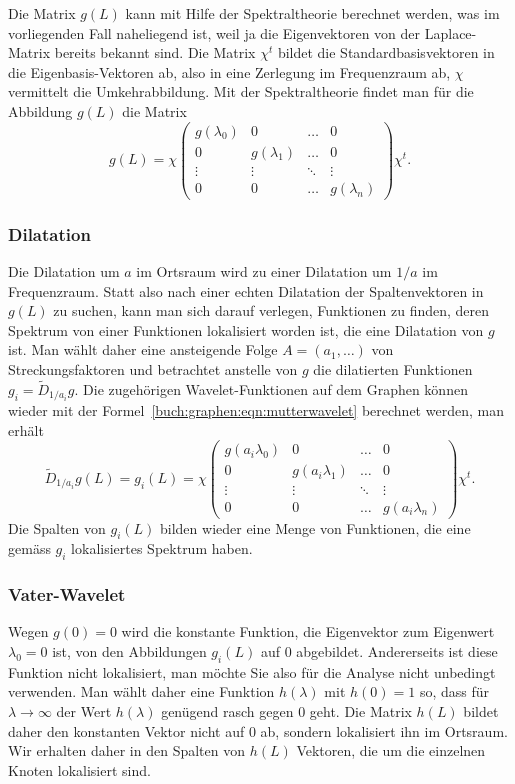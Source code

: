 Die Matrix $g(L)$ kann mit Hilfe der Spektraltheorie berechnet werden,
was im vorliegenden Fall naheliegend ist, weil ja die Eigenvektoren von
der Laplace-Matrix bereits bekannt sind.
Die Matrix $\chi^t$ bildet die Standardbasisvektoren in die
Eigenbasis-Vektoren ab, also in eine Zerlegung im Frequenzraum ab,
$\chi$ vermittelt die Umkehrabbildung.
Mit der Spektraltheorie findet man für die Abbildung $g(L)$ die Matrix
\begin{equation}
g(L)
=
\chi
\begin{pmatrix}
g(\lambda_0)&0&\dots&0\\
0&g(\lambda_1)&\dots&0\\
\vdots&\vdots&\ddots&\vdots\\
0&0&\dots&g(\lambda_n)
\end{pmatrix}
\chi^t.
\label{buch:graphen:eqn:mutterwavelet}
\end{equation}

\subsubsection{Dilatation}
Die Dilatation um $a$ im Ortsraum wird zu einer Dilatation um $1/a$ im
Frequenzraum.
Statt also nach einer echten Dilatation der Spaltenvektoren in $g(L)$
zu suchen, kann man sich darauf verlegen, Funktionen zu finden, deren
Spektrum von einer Funktionen lokalisiert worden ist, die eine Dilatation
von $g$ ist.
Man wählt daher eine ansteigende Folge $A=(a_1,\dots)$ von Streckungsfaktoren
und betrachtet anstelle von $g$ die dilatierten Funktionen
$g_i=\tilde{D}_{1/a_i}g$.
Die zugehörigen Wavelet-Funktionen auf dem Graphen können wieder mit
der Formel~\eqref{buch:graphen:eqn:mutterwavelet} berechnet werden,
man erhält
\begin{equation}
\tilde{D}_{1/a_i}g(L)
=
g_i(L)
=
\chi
\begin{pmatrix}
g(a_i\lambda_0)&0&\dots&0\\
0&g(a_i\lambda_1)&\dots&0\\
\vdots&\vdots&\ddots&\vdots\\
0&0&\dots&g(a_i\lambda_n)
\end{pmatrix}
\chi^t .
\end{equation}
Die Spalten von $g_i(L)$ bilden wieder eine Menge von Funktionen, die
eine gemäss $g_i$ lokalisiertes Spektrum haben.

\subsubsection{Vater-Wavelet}
Wegen $g(0)=0$ wird die konstante Funktion, die Eigenvektor zum Eigenwert
$\lambda_0=0$ ist, von den Abbildungen $g_i(L)$ auf $0$ abgebildet.
Andererseits ist diese Funktion nicht lokalisiert, man möchte Sie also
für die Analyse nicht unbedingt verwenden.
Man wählt daher eine Funktion $h(\lambda)$ mit $h(0)=1$ so, dass
für $\lambda\to \infty$ der Wert $h(\lambda)$ genügend rasch gegen $0$
geht.
Die Matrix $h(L)$ bildet daher den konstanten Vektor nicht auf $0$ ab,
sondern lokalisiert ihn im Ortsraum.
Wir erhalten daher in den Spalten von $h(L)$ Vektoren, die um die
einzelnen Knoten lokalisiert sind.

